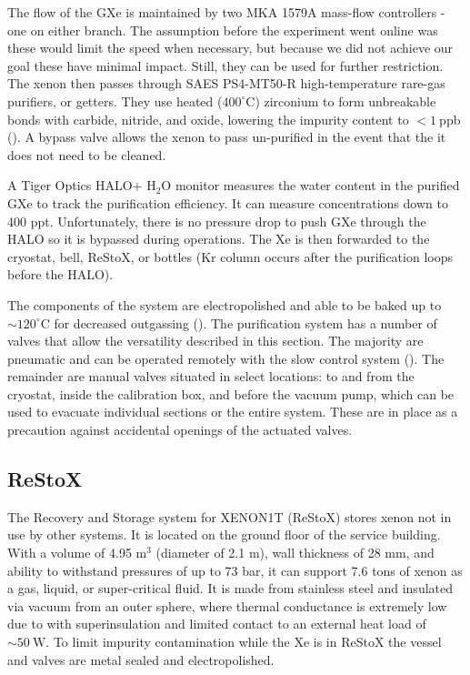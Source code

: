 The flow of the GXe is maintained by two MKA 1579A mass-flow controllers - one on either branch.  The assumption before the experiment
went
online was these would limit the speed when necessary, but because we did not achieve our goal these have minimal impact.  Still, they can
be used for further restriction.  The xenon then passes through SAES PS4-MT50-R high-temperature rare-gas purifiers, or getters.  They
use heated ($400^{\circ}\mathrm{C}$) zirconium to form unbreakable bonds with carbide, nitride, and oxide, lowering the impurity content
to $< 1\ \mathrm{ppb}$ ().  A bypass valve allows the xenon to pass un-purified in the event that the it does not
need to be cleaned.

A Tiger Optics HALO+ H$_2$O monitor measures the water content in the purified GXe to track the purification efficiency.  It can measure
concentrations down to 400 ppt.  Unfortunately, there is no pressure drop to push GXe through the HALO so it is bypassed during
operations.  The Xe is then forwarded to the cryostat, bell, ReStoX, or
bottles (Kr column occurs after the purification loops before the HALO).

The components of the system are electropolished and able to be baked up to ${\sim} 120^{\circ}\mathrm{C}$ for decreased outgassing
().  The purification system has a number of valves that allow the versatility described in this section.  The majority are
pneumatic and can
be operated remotely with the slow control system ().  The remainder are manual valves
situated in select locations: to and from the cryostat,
inside the calibration box, and before the vacuum pump, which can be used to evacuate individual sections or the entire system.  These are
in place as a precaution against accidental openings of the actuated valves.


\subsection{ReStoX}
\label{subsec:xenon1t_restox}
The Recovery and Storage system for XENON1T (ReStoX) stores xenon not in use by other systems.  It is located on the ground floor of the
service building.  With a volume of 4.95 m$^{3}$
(diameter of 2.1 m), wall thickness of 28 mm, and ability to withstand pressures of up to 73 bar, it can support 7.6 tons of
xenon
as a gas, liquid, or super-critical fluid.  It is made from stainless steel and insulated via vacuum from an outer sphere, where
thermal conductance is extremely low due to with superinsulation and limited contact to an external heat load of
${\sim}50\ \mathrm{W}$.  To limit
impurity contamination while the Xe is in ReStoX the vessel and valves are metal sealed and electropolished.

